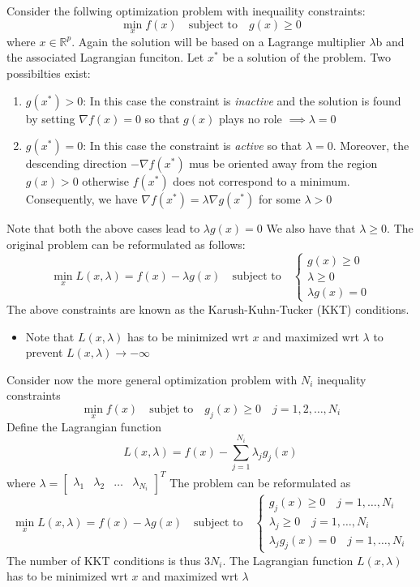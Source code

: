 \documentclass{book}
\begin{document}
Consider the follwing optimization problem with inequaility constraints:
\[
    \min_x f(x)\quad\text{subject to}\quad g(x)\geq 0
\]
where $x\in\mathbb{R}^p$. Again the solution will be based on a Lagrange multiplier $\lambda$b and the associated Lagrangian funciton. Let $x^*$ be a solution of the problem. Two possibilties exist: 
\begin{enumerate}
    \item $g(x^*)>0$: In this case the constraint is \emph{inactive} and the solution is found by setting $\nabla f(x)=0$ so that $g(x)$ plays no role $\implies \lambda=0$
    \item $g(x^*)=0$: In this case the constraint is \emph{active} so that $\lambda=0$. Moreover, the descending direction $-\nabla f(x^*)$ mus be oriented away from the region $g(x)>0$ otherwise $f(x^*)$ does not correspond to a minimum. Consequently, we have $\nabla f(x^*)=\lambda\nabla g(x^*)$ for some $\lambda>0$
\end{enumerate}
Note that both the above cases lead to $\lambda g(x)=0$ We also have that $\lambda\geq 0$.
The original problem can be reformulated as follows: 
\[
    \min_x L(x,\lambda)=f(x)-\lambda g(x) \quad \text{subject to}\quad \begin{cases}
        g(x) \geq 0\\
        \lambda \geq 0 \\
        \lambda g(x) = 0
    \end{cases}
\]
The above constraints are known as the Karush-Kuhn-Tucker (KKT) conditions. 
\begin{itemize}
    \item Note that $L(x,\lambda)$ has to be minimized wrt $x$ and maximized wrt $\lambda$ to prevent $L(x,\lambda)\to-\infty$
\end{itemize}
Consider now the more general optimization problem with $N_i$ inequality constraints 
\[
    \min_x f(x) \quad \text{subjet to}\quad g_j(x)\geq 0\quad j=1,2,\dots,N_i
\]
Define the Lagrangian function 
\[
    L(x,\lambda)= f(x)-\displaystyle\sum_{j=1}^{N_i}\lambda_jg_j(x)
\]
where $\lambda=\begin{bmatrix}
    \lambda_1 & \lambda_2 & \dots & \lambda_{N_i}
\end{bmatrix}^T$
The problem can be reformulated as
\[
    \min_x L(x,\lambda)=f(x)-\lambda g(x) \quad \text{subject to}\quad \begin{cases}
        g_j(x) \geq 0 \quad j=1,\dots,N_i\\
        \lambda_j \geq 0 \quad j=1,\dots,N_i\\
        \lambda_j g_j(x) = 0 \quad j=1,\dots,N_i
    \end{cases}
\]
The number of KKT conditions is thus $3N_i$. The Lagrangian function $L(x,\lambda)$ has to be minimized wrt $x$ and maximized wrt $\lambda$
\end{document}
